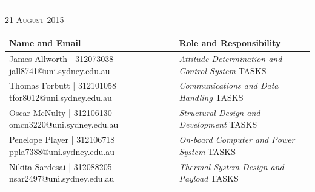 \begin{titlepage}
\begin{center}
\begin{minipage}{\linewidth}
    \vspace{1cm}
    \hrule
    \vspace{1.3cm}
     {\large \textsc{21 August 2015}}
\vspace{1.3cm}
    \begin{table}[H]
        \centering
        \vspace{0.2cm}
        \label{tab:maxturbulencealpha}
        {\renewcommand{\arraystretch}{1.7}%
            \begin{tabular}{|>{\centering\arraybackslash}m{6cm}|>{\centering\arraybackslash}m{9cm}|}
                \hline
                \textbf{Name and Email} & \textbf{Role and Responsibility} \\ \hline\hline
                James Allworth | 312073038  jall8741@uni.sydney.edu.au & \textit{Attitude Determination and Control System} \newline TASKS  \\\hline
                Thomas Forbutt | 312101058  tfor8012@uni.sydney.edu.au & \textit{Communications and Data Handling} \newline TASKS \\\hline
                Oscar McNulty | 312106130  omcn3220@uni.sydney.edu.au & \textit{Structural Design and Development} \newline TASKS \\\hline
                Penelope Player | 312106718  ppla7388@uni.sydney.edu.au & \textit{On-board Computer and Power System} \newline TASKS \\\hline
                Nikita Sardesai | 312088205  nsar2497@uni.sydney.edu.au & \textit{Thermal System Design and Payload} \newline TASKS \\\hline
                \end{tabular} } 
        \end{table}
    
\end{minipage}
\end{center}

\end{titlepage}